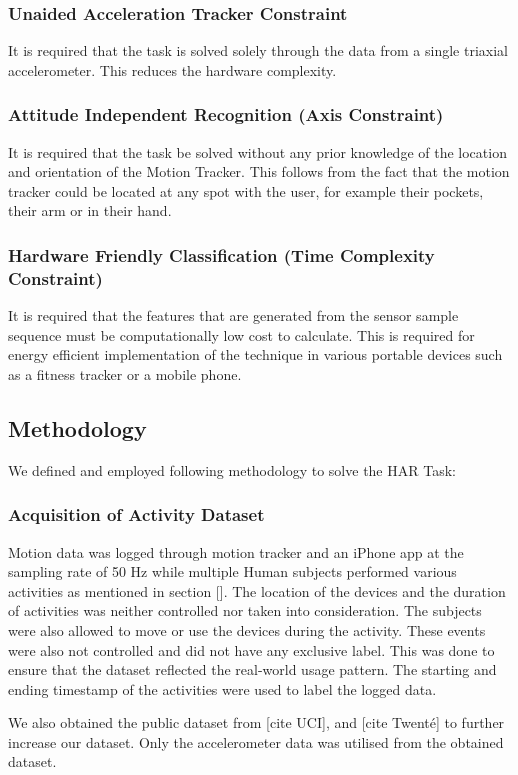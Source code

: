 \documentclass[
10pt, %
a4paper, %
oneside, %
headinclude,footinclude, %
BCOR5mm, %
]{scrartcl}
\begin{document}
\subsubsection{Unaided Acceleration Tracker Constraint}
It is required that the task is solved solely through the data from a single triaxial accelerometer. This reduces the hardware complexity.
\subsubsection{Attitude Independent Recognition (Axis Constraint)} 
It is required that the task be solved without any prior knowledge of the location and orientation of the Motion Tracker. This follows from the fact that the motion tracker could be located at any spot with the user, for example their pockets, their arm or in their hand.
\subsubsection{Hardware Friendly Classification (Time Complexity Constraint)}
It is required that the features that are generated from the sensor sample sequence must be computationally low cost to calculate. This is required for energy efficient implementation of the technique in various portable devices such as a fitness tracker or a mobile phone.
\subsection{Methodology}
We defined and employed following methodology to solve the HAR Task:
\subsubsection{Acquisition of Activity Dataset}
Motion data was logged through motion tracker and an iPhone app at the sampling rate of 50 Hz while multiple Human subjects performed various activities as mentioned in section []. The location of the devices and the duration of activities was neither controlled nor taken into consideration. The subjects were also allowed to move or use the devices during the activity. These events were also not controlled and did not have any exclusive label. This was done to ensure that the dataset reflected the real-world usage pattern. The starting and ending timestamp of the activities were used to label the logged data.

We also obtained the public dataset from [cite UCI], and [cite Twenté] to further increase our dataset. Only the accelerometer data was utilised from the obtained dataset.
\end{document}
